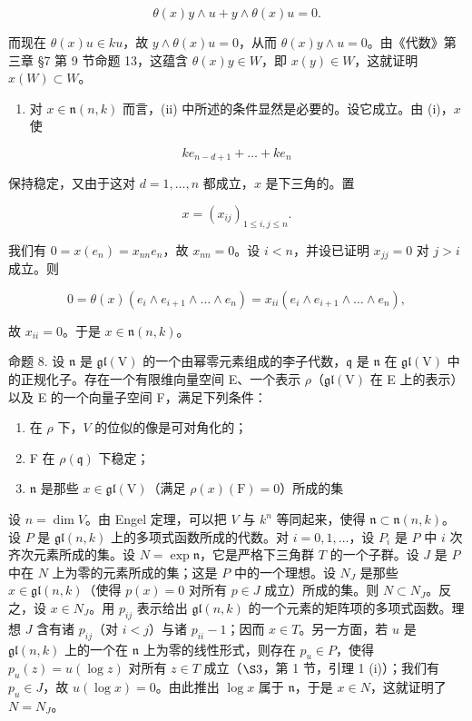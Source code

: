 \[
\theta (x) y \wedge u + y \wedge \theta (x) u = 0.
\]

而现在 \(\theta(x)u\in ku\)，故 \(y\wedge\theta(x)u=0\)，从而 \(\theta(x)y\wedge u=0\)。由《代数》第三章 §7 第 9 节命题 13，这蕴含 \(\theta(x)y\in W\)，即 \(x(y)\in W\)，这就证明 \(x(W)\subset W\)。

\begin{enumerate}
\def\labelenumi{(\roman{enumi})}
\setcounter{enumi}{1}
\tightlist
\item
  对 \(x \in \mathfrak{n}(n, k)\) 而言，(ii) 中所述的条件显然是必要的。设它成立。由 (i)，\(x\) 使
\end{enumerate}

\[
k e _ {n - d + 1} + \dots + k e _ {n}
\]

保持稳定，又由于这对 \(d = 1, \ldots, n\) 都成立，\(x\) 是下三角的。置

\[
x = (x _ {i j}) _ {1 \leq i, j \leq n}.
\]

我们有 \(0 = x(e_n) = x_{nn}e_n\)，故 \(x_{nn} = 0\)。设 \(i < n\)，并设已证明 \(x_{jj} = 0\) 对 \(j > i\) 成立。则

\[
0 = \theta (x) \left(e _ {i} \wedge e _ {i + 1} \wedge \dots \wedge e _ {n}\right) = x _ {i i} \left(e _ {i} \wedge e _ {i + 1} \wedge \dots \wedge e _ {n}\right),
\]

故 \(x_{ii} = 0\)。于是 \(x \in \mathfrak{n}(n,k)\)。

命题 8. 设 \(\mathfrak{n}\) 是 \(\mathfrak{gl}(\mathrm{V})\) 的一个由幂零元素组成的李子代数，\(\mathfrak{q}\) 是 \(\mathfrak{n}\) 在 \(\mathfrak{gl}(\mathrm{V})\) 中的正规化子。存在一个有限维向量空间 E、一个表示 \(\rho\)（\(\mathfrak{gl}(\mathrm{V})\) 在 E 上的表示）以及 E 的一个向量子空间 F，满足下列条件：

\begin{enumerate}
\def\labelenumi{(\roman{enumi})}
\item
  在 \(\rho\) 下，\(V\) 的位似的像是可对角化的；
\item
  F 在 \(\rho(\mathfrak{q})\) 下稳定；
\item
  \(\mathfrak{n}\) 是那些 \(x\in \mathfrak{gl}(\mathrm{V})\)（满足 \(\rho (x)(\mathrm{F}) = 0\)）所成的集
\end{enumerate}

设 \(n = \dim V\)。由 Engel 定理，可以把 \(V\) 与 \(k^n\) 等同起来，使得 \(\mathfrak{n} \subset \mathfrak{n}(n,k)\)。设 \(P\) 是 \(\mathfrak{gl}(n,k)\) 上的多项式函数所成的代数。对 \(i = 0,1,\ldots\)，设 \(P_i\) 是 \(P\) 中 \(i\) 次齐次元素所成的集。设 \(N = \exp \mathfrak{n}\)，它是严格下三角群 \(T\) 的一个子群。设 \(J\) 是 \(P\) 中在 \(N\) 上为零的元素所成的集；这是 \(P\) 中的一个理想。设 \(N_J\) 是那些 \(x \in \mathfrak{gl}(n,k)\)（使得 \(p(x) = 0\) 对所有 \(p \in J\) 成立）所成的集。则 \(N \subset N_J\)。反之，设 \(x \in N_J\)。用 \(p_{ij}\) 表示给出 \(\mathfrak{gl}(n,k)\) 的一个元素的矩阵项的多项式函数。理想 \(J\) 含有诸 \(p_{ij}\)（对 \(i < j\)）与诸 \(p_{ii} - 1\)；因而 \(x \in T\)。另一方面，若 \(u\) 是 \(\mathfrak{gl}(n,k)\) 上的一个在 \(\mathfrak{n}\) 上为零的线性形式，则存在 \(p_u \in P\)，使得 \(p_u(z) = u(\log z)\) 对所有 \(z \in T\) 成立（\(\S 3\)，第 1 节，引理 1 (i)）；我们有 \(p_u \in J\)，故 \(u(\log x) = 0\)。由此推出 \(\log x\) 属于 \(\mathfrak{n}\)，于是 \(x \in N\)，这就证明了 \(N = N_J\)。

